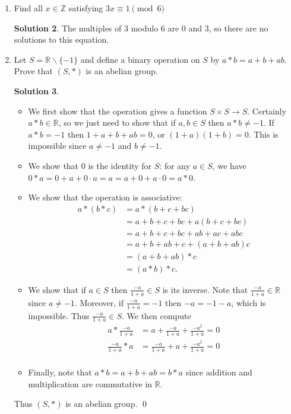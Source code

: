 \documentclass{article}
\newcommand{\RR}{\mathbb{R}}
\newcommand{\ZZ}{\mathbb{Z}}
\theoremstyle{definition}
\newtheorem*{solution}{Solution}
\begin{document}
\begin{enumerate}
\begin{solution}
\end{solution}
\item[3.1(f).] Find all $x \in \ZZ$ satisfying $3x \equiv 1 \pmod{6}$
\begin{solution}
The multiples of $3$ modulo $6$ are $0$ and $3$, so there are no solutions to this equation.
\end{solution}
\item[3.7.] Let $S = \RR \backslash \{-1\}$ and define a binary operation on $S$ by $a * b = a + b + ab$.  Prove that $(S, *)$ is an abelian group.
\begin{solution} $ $
\begin{itemize}
\item We first show that the operation gives a function $S \times S \to S$.  Certainly $a * b \in \RR$, so we just need to show that if $a,b \in S$ then $a*b \ne -1$.  If $a * b = -1$ then $1 + a + b + ab = 0$, or $(1+a)(1+b) = 0$.  This is impossible since $a \ne -1$ and $b \ne -1$.
\item We show that $0$ is the identity for $S$: for any $a \in S$, we have $0 * a = 0 + a + 0\cdot a = a = a + 0 + a \cdot 0 = a * 0$.
\item We show that the operation is associative:
\begin{align*}
a * (b * c) &= a*(b + c + bc) \\
&= a + b + c + bc + a(b + c + bc) \\
&= a + b + c + bc + ab + ac + abc \\
&= a + b + ab + c + (a + b + ab)c \\
&= (a + b + ab) * c\\
&= (a * b) * c.
\end{align*}
\item We show that if $a \in S$ then $\frac{-a}{1+a} \in S$ is its inverse.  Note that $\frac{-a}{1+a} \in \RR$ since $a \ne -1$.  Moreover, if $\frac{-a}{1+a} = -1$ then $-a = -1 - a$, which is impossible.  Thus $\frac{-a}{1+a} \in S$.  We then compute
\begin{align*}
a * \frac{-a}{1+a} &= a + \frac{-a}{1+a} + \frac{-a^2}{1+a} = 0 \\
\frac{-a}{1+a} * a &= \frac{-a}{1+a} + a + \frac{-a^2}{1+a} = 0 \\
\end{align*}
\item Finally, note that $a * b = a + b + ab = b*a$ since addition and multiplication are commutative in $\RR$.
\end{itemize}
Thus $(S, *)$ is an abelian group. \qed

\end{solution}
\end{enumerate}
\end{document}

